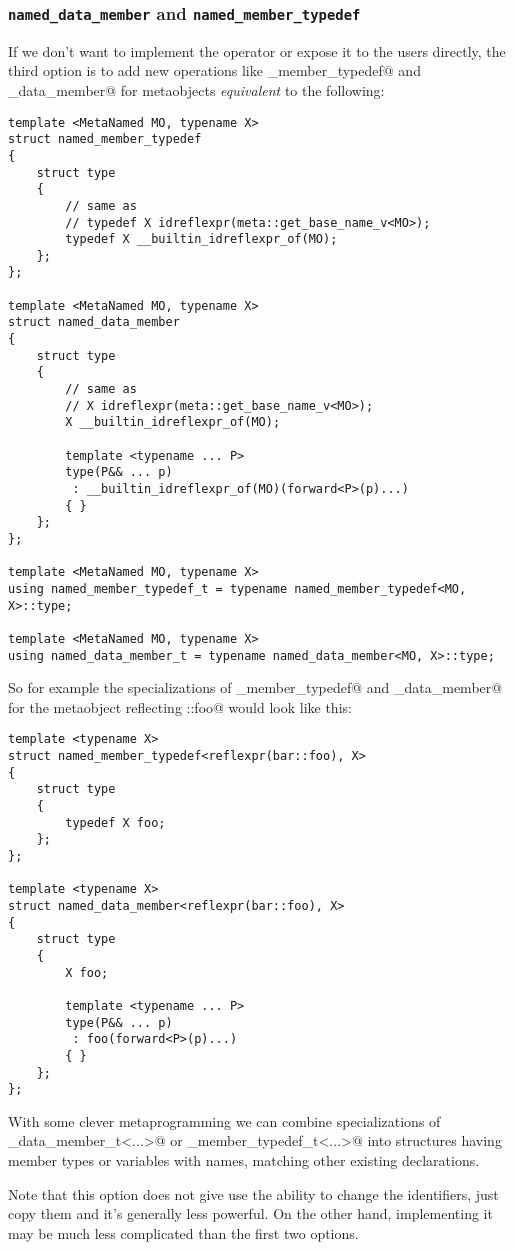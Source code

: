 \subsubsection{\texttt{named\_data\_member} and \texttt{named\_member\_typedef}}
\label{fut-named-member-X}

If we don't want to implement the operator \verb@idreflexpr@ or expose it
to the users directly, the third option is to add new operations like
\verb@named_member_typedef@  and \verb@named_data_member@ for 
metaobjects {\em equivalent} to the following:

\begin{verbatim}
template <MetaNamed MO, typename X>
struct named_member_typedef
{
	struct type
	{
		// same as
		// typedef X idreflexpr(meta::get_base_name_v<MO>);
		typedef X __builtin_idreflexpr_of(MO);
	};
};

template <MetaNamed MO, typename X>
struct named_data_member
{
	struct type
	{
		// same as
		// X idreflexpr(meta::get_base_name_v<MO>);
		X __builtin_idreflexpr_of(MO);

		template <typename ... P>
		type(P&& ... p)
		 : __builtin_idreflexpr_of(MO)(forward<P>(p)...) 
		{ }
	};
};

template <MetaNamed MO, typename X>
using named_member_typedef_t = typename named_member_typedef<MO, X>::type;

template <MetaNamed MO, typename X>
using named_data_member_t = typename named_data_member<MO, X>::type;
\end{verbatim}

So for example the specializations of \verb@named_member_typedef@ and
\verb@named_data_member@ for the metaobject reflecting \verb@bar::foo@ would
look like this:

\begin{verbatim}
template <typename X>
struct named_member_typedef<reflexpr(bar::foo), X>
{
	struct type
	{
		typedef X foo;
	};
};

template <typename X>
struct named_data_member<reflexpr(bar::foo), X>
{
	struct type
	{
		X foo;

		template <typename ... P>
		type(P&& ... p)
		 : foo(forward<P>(p)...) 
		{ }
	};
};
\end{verbatim}

With some clever metaprogramming we can combine specializations
of \verb@named_data_member_t<...>@ or \verb@named_member_typedef_t<...>@
into structures having member types or variables with names, matching other
existing declarations.

Note that this option does not give use the ability to change the identifiers,
just copy them and it's generally less powerful.
On the other hand, implementing it may be much less complicated
than the first two options.

